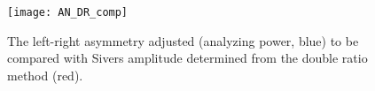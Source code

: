 \begin{figure}[h!t]
  \centering \texttt{[image: AN\_DR\_comp]}
  \caption{The left-right asymmetry adjusted (analyzing power, blue) to be
    compared with Sivers amplitude determined from the double ratio method
    (red).}
  \label{fig::AN_DR_comp}
\end{figure}


%
